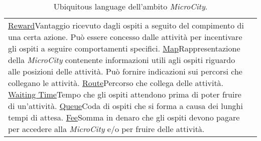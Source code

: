 \begin{table}[H]
\begin{tabular}{|l|p{}|}
        \ul{Reward}{Vantaggio ricevuto dagli ospiti a seguito del compimento di una certa azione. Può essere concesso dalle attività per incentivare gli ospiti a seguire comportamenti specifici.}
        \ul{Map}{Rappresentazione della \textit{MicroCity} contenente informazioni utili agli ospiti riguardo alle posizioni delle attività. Può fornire indicazioni sui percorsi che collegano le attività.}
        \ul{Route}{Percorso che collega delle attività.}
        \ul{Waiting Time}{Tempo che gli ospiti attendono prima di poter fruire di un'attività.}
        \ul{Queue}{Coda di ospiti che si forma a causa dei lunghi tempi di attesa.}
        \ul{Fee}{Somma in denaro che gli ospiti devono pagare per accedere alla \textit{MicroCity} e/o per fruire delle attività.}
    \end{tabular}
    \caption{Ubiquitous language dell'ambito \textit{MicroCity}.}
    \label{tab:ul}
\end{table}
